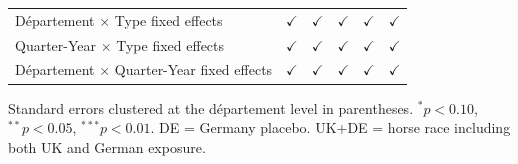 \begin{table}[htbp]
\begin{tabular}{lccccc}
      D\'epartement $\times$ Type fixed effects                   & $\checkmark$  & $\checkmark$  & $\checkmark$  & $\checkmark$          & $\checkmark$\\   
      Quarter-Year $\times$ Type fixed effects                     & $\checkmark$  & $\checkmark$  & $\checkmark$  & $\checkmark$          & $\checkmark$\\   
      D\'epartement $\times$ Quarter-Year fixed effects                     & $\checkmark$  & $\checkmark$  & $\checkmark$  & $\checkmark$          & $\checkmark$\\   
      \bottomrule
   \end{tabular}
\par\vspace{0.3em}\noindent\footnotesize Standard errors clustered at the d\'epartement level in parentheses. $^{*}p<0.10$, $^{**}p<0.05$, $^{***}p<0.01$. DE = Germany placebo. UK+DE = horse race including both UK and German exposure.
\end{table}


